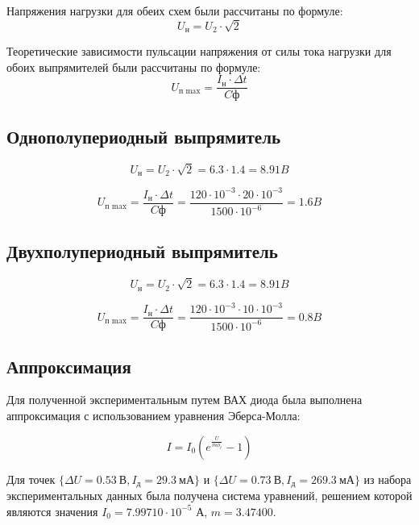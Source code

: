 \documentclass[a4paper,14pt]{extarticle}
\begin{document}
Напряжения нагрузки для обеих схем были рассчитаны по формуле:
\begin{equation}\label{eq:u_nagr}
U_\text{н} = U_2 \cdot \sqrt{2}
\end{equation}

Теоретические зависимости пульсации напряжения от силы тока нагрузки для обоих выпрямителей были рассчитаны по формуле:
\begin{equation}\label{eq:u_puls}
U_\text{п max} = \frac{I_\text{н} \cdot \Delta t}{C\text{ф}}
\end{equation}

\subsection{Однополупериодный выпрямитель}

\[
U_\text{н} = U_2 \cdot \sqrt{2} = 6.3 \cdot 1.4 = 8.91 B
\]

\[
U_\text{п max} = \frac{I_\text{н} \cdot \Delta t}{C\text{ф}} = \frac{120 \cdot 10^{-3}\cdot 20 \cdot 10^{-3}}{1500 \cdot 10^{-6}} = 1.6 B
\]

\subsection{Двухполупериодный выпрямитель}

\[
U_\text{н} = U_2 \cdot \sqrt{2} = 6.3 \cdot 1.4 = 8.91 B
\]

\[
U_\text{п max} = \frac{I_\text{н} \cdot \Delta t}{C\text{ф}} = \frac{120 \cdot 10^{-3}\cdot 10 \cdot 10^{-3}}{1500 \cdot 10^{-6}} = 0.8 B
\]

\subsection{Аппроксимация}

Для полученной экспериментальным путем ВАХ диода была выполнена аппроксимация с использованием уравнения Эберса-Молла:
\begin{large}
	\[I = I_0 (e^{\frac{U}{m \phi_t}} - 1)\]
\end{large}

Для точек 
$\{\Delta U=0.53\ \text{В}, I_\text{д}=29.3\ \text{мА}\}$ 
и 
$\{\Delta U=0.73\ \text{В}, I_\text{д}=269.3\ \text{мА}\}$ 
из набора экспериментальных данных была получена система уравнений, решением которой являются значения 
$I_0 = 7.99710 \cdot 10^{-5}$ А, $m =  3.47400$.

\newpage
\end{document}
